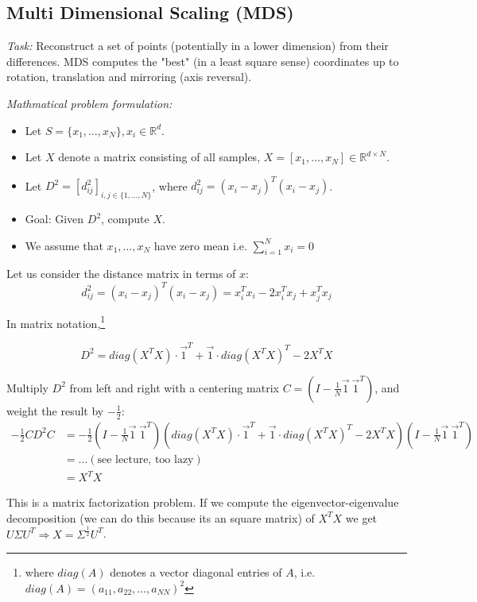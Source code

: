 
\subsection*{Multi Dimensional Scaling (MDS)}

\textit{Task:} Reconstruct a set of points (potentially in a lower dimension) from their differences. MDS computes the "best" (in a least square sense) coordinates up to rotation, translation and mirroring (axis reversal).

\textit{Mathmatical problem formulation:}
\begin{itemize}
    \item
        Let \(S = \{x_1, \dots, x_N\}, x_i \in \mathbb{R}^d\).
    \item
        Let \(X\) denote a matrix consisting of all samples, \(X=[x_1, \dots, x_N] \in \mathbb{R}^{d \times N}\).
    \item
        Let \(D^2 = [d_{ij}^2]_{i, j \in \{1, \dots, N\}}\), where \(d_{ij}^2 = (x_i - x_j)^T (x_i - x_j)\).
    \item
        Goal: Given \(D^2\), compute \(X\).
    \item
        We assume that \(x_1, \dots, x_N\) have zero mean i.e. \(\sum_{i=1}^N x_i = 0\)
\end{itemize}

Let us consider the distance matrix in terms of \(x\):
\[d_{ij}^2 = (x_i - x_j)^T(x_i - x_j)=x_i^T x_i - 2 x_i^T x_j + x_j^T x_j \]

In matrix notation,\footnote{where \(diag(A)\) denotes a vector diagonal entries of \(A\), i.e. \(diag(A) = (a_{11}, a_{22}, \dots, a_{NN})^2\)}

\[D^2 = diag(X^T X) \cdot \vec{1}^T + \vec{1} \cdot diag(X^T X)^T - 2X^TX\]


Multiply \(D^2\) from left and right with a centering matrix \(C = (I - \frac{1}{N} \vec{1} \ \vec{1}^T)\), and weight the result by \(-\frac{1}{2}\):
\begin{align*}
    -\frac{1}{2} C D^2 C &= -\frac{1}{2} (I- \frac{1}{N} \vec{1} \ \vec{1}^T) (diag(X^T X) \cdot \vec{1}^T + \vec{1} \cdot diag(X^T X)^T - 2X^TX)(I- \frac{1}{N} \vec{1} \ \vec{1}^T)\\
    &= \dots (\text{see lecture, too lazy}) \\
    &= X^T X
\end{align*}

This is a matrix factorization problem. If we compute the eigenvector-eigenvalue decomposition (we can do this because its an square matrix) of \(X^T X\) we get \(U \Sigma U^T \Rightarrow X = \Sigma^{\frac{1}{2}} U^T\).

